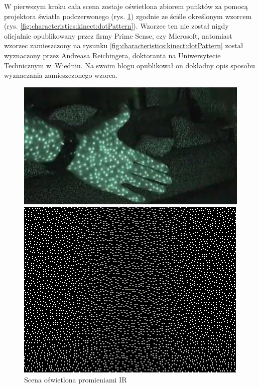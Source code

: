 W pierwszym kroku cała scena zostaje oświetlona zbiorem punktów za pomocą projektora światła podczerwonego (rys. \ref{fig:characteristics:kinect:nightVision}) zgodnie ze ściśle określonym wzorcem (rys. \ref{fig:characteristics:kinect:dotPattern}). Wzorzec ten nie został nigdy oficjalnie opublikowany przez firmy Prime Sense, czy Microsoft, natomiast wzorzec zamieszczony na rysunku \ref{fig:characteristics:kinect:dotPattern} został wyznaczony przez Andreasa Reichingera, doktoranta na Uniwersytecie Technicznym w~Wiedniu. Na swoim blogu opublikował on dokładny opis sposobu wyznaczania zamieszczonego wzorca{}.
																															
\begin{savenotes}
	\begin{figure}[!htb]
		\centering
		\begin{minipage}[b]{0.48\linewidth}
			\centering   
			\includegraphics[width=\textwidth]{images/kinectNightVision.jpg}	
			\caption[Scena oświetlona promieniami podczerwonymi]{Scena oświetlona promieniami IR}
			\label{fig:characteristics:kinect:nightVision}
		\end{minipage}
		\hfill
		\begin{minipage}[b]{0.48\linewidth}
			\centering 
			\includegraphics[width=\textwidth]{images/kinect-pattern_3x3.png}

\end{minipage}
\end{figure}
\end{savenotes}
